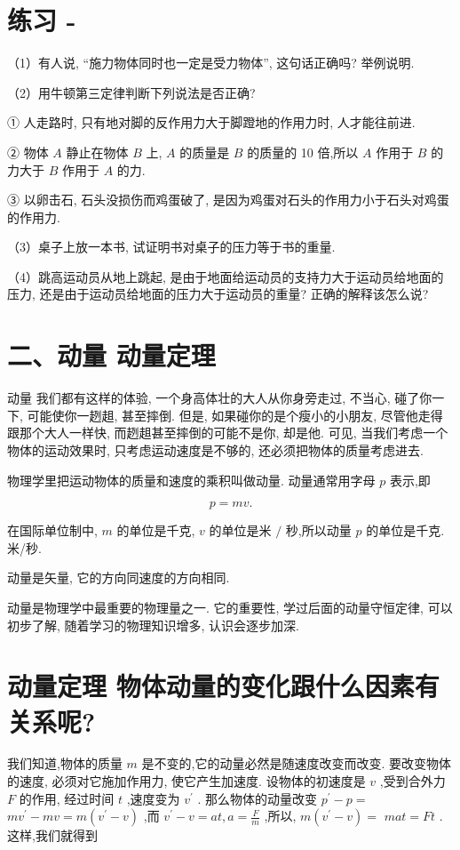 \documentclass[10pt]{article}
\begin{document}
\section*{练习 -}

（1）有人说, “施力物体同时也一定是受力物体”, 这句话正确吗? 举例说明.

（2）用牛顿第三定律判断下列说法是否正确?

① 人走路时, 只有地对脚的反作用力大于脚蹬地的作用力时, 人才能往前进.

② 物体 \(A\) 静止在物体 \(B\) 上, \(A\) 的质量是 \(B\) 的质量的 10 倍,所以 \(A\) 作用于 \(B\) 的力大于 \(B\) 作用于 \(A\) 的力.

③ 以卵击石, 石头没损伤而鸡蛋破了, 是因为鸡蛋对石头的作用力小于石头对鸡蛋的作用力.

（3）桌子上放一本书, 试证明书对桌子的压力等于书的重量.

（4）跳高运动员从地上跳起, 是由于地面给运动员的支持力大于运动员给地面的压力, 还是由于运动员给地面的压力大于运动员的重量? 正确的解释该怎么说?

\section*{二、动量 动量定理}

动量 我们都有这样的体验, 一个身高体壮的大人从你身旁走过, 不当心, 碰了你一下, 可能使你一趔趄, 甚至摔倒. 但是, 如果碰你的是个瘦小的小朋友, 尽管他走得跟那个大人一样快, 而趔趄甚至摔倒的可能不是你, 却是他. 可见, 当我们考虑一个物体的运动效果时, 只考虑运动速度是不够的, 还必须把物体的质量考虑进去.

物理学里把运动物体的质量和速度的乘积叫做动量. 动量通常用字母 \(p\) 表示,即

\[
p = {mv}\text{.}
\]

在国际单位制中, \(m\) 的单位是千克, \(v\) 的单位是米 \(/\) 秒,所以动量 \(p\) 的单位是千克. 米/秒.

动量是矢量, 它的方向同速度的方向相同.

动量是物理学中最重要的物理量之一. 它的重要性, 学过后面的动量守恒定律, 可以初步了解, 随着学习的物理知识增多, 认识会逐步加深.

\section*{动量定理 物体动量的变化跟什么因素有关系呢?}

我们知道,物体的质量 \(m\) 是不变的,它的动量必然是随速度改变而改变. 要改变物体的速度, 必须对它施加作用力, 使它产生加速度. 设物体的初速度是 \(v\) ,受到合外力 \(F\) 的作用, 经过时间 \(t\) ,速度变为 \({v}^{\prime }\) . 那么物体的动量改变 \({p}^{\prime } - p =\) \(m{v}^{\prime } - {mv} = m\left( {{v}^{\prime } - v}\right)\) ,而 \({v}^{\prime } - v = {at},a = \frac{F}{m}\) ,所以, \(m\left( {{v}^{\prime } - v}\right) =\) \({mat} = {Ft}\) . 这样,我们就得到
\end{document}
